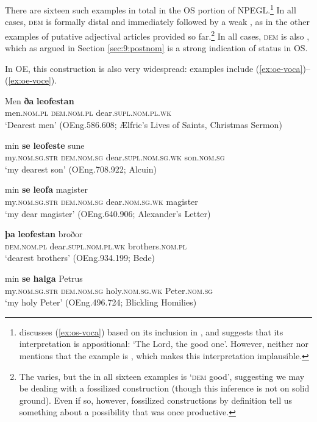 \documentclass[output=paper,colorlinks,citecolor=brown]{langscibook}
\begin{document}
There are sixteen such examples in total in the OS portion of NPEGL.\footnote{\citet[160]{Allen2006} discusses (\ref{ex:os-voca}) based on its inclusion in \citet{Heinrichs54}, and suggests that its interpretation is appositional: `The Lord, the good one'. However, neither \citet{Heinrichs54} nor \citet{Allen2006} mentions that the example is , which makes this interpretation implausible.} In all cases, \textsc{dem} is formally distal and immediately followed by a weak , as in the other examples of putative adjectival articles provided so far.\footnote{The  varies, but the  in all sixteen examples is `\textsc{dem} good', suggesting we may be dealing with a fossilized construction (though this inference is not on solid ground). Even if so, however, fossilized constructions by definition tell us something about a possibility that was once productive.} In all cases, \textsc{dem} is also , which as argued in Section \ref{sec:9:postnom} is a strong indication of  status in OS.

In OE, this construction is also very widespread: examples include (\ref{ex:oe-voca})--(\ref{ex:oe-voce}).

\begin{exe}     
 \ex\label{ex:oe-voc}
 \begin{xlist}
     \ex \label{ex:oe-voca} \gll Men \textbf{ða} \textbf{leofestan}\\
     men.\textsc{nom.pl} \textsc{dem.nom.pl} dear.\textsc{supl.nom.pl.wk}\\
     \glt `Dearest men' (OEng.586.608; Ælfric's Lives of Saints, Christmas Sermon)
     
     \ex\gll min \textbf{se} \textbf{leofeste} sune\\
     my.\textsc{nom.sg.str} \textsc{dem.nom.sg} dear.\textsc{supl.nom.sg.wk} son.\textsc{nom.sg}\\
     \glt `my dearest son' (OEng.708.922; Alcuin)
     
     \ex\gll min \textbf{se} \textbf{leofa} magister\\
     my.\textsc{nom.sg.str} \textsc{dem.nom.sg} dear.\textsc{nom.sg.wk} magister\\
     \glt `my dear magister' (OEng.640.906; Alexander's Letter)
     
     \ex\gll \textbf{þa} \textbf{leofestan} broðor\\
     \textsc{dem.nom.pl} dear.\textsc{supl.nom.pl.wk} brothers.\textsc{nom.pl}\\
     \glt `dearest brothers' (OEng.934.199; Bede)
     
     \ex \label{ex:oe-voce} \gll min \textbf{se} \textbf{halga} Petrus\\
     my.\textsc{nom.sg.str} \textsc{dem.nom.sg} holy.\textsc{nom.sg.wk} Peter.\textsc{nom.sg}\\
     \glt `my holy Peter' (OEng.496.724; Blickling Homilies)
 \end{xlist}
\end{exe}     
\end{document}

